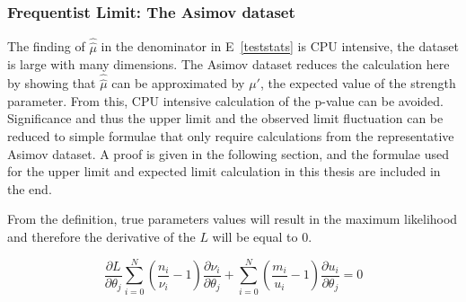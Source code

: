 


%
%
%
%





\subsubsection{Frequentist Limit: The Asimov dataset}
\label{sec:asimov}

The finding of $\hat{\hat{\mu}}$ in the denominator in E~\ref{teststats} is CPU intensive, the dataset is large with many dimensions. The Asimov dataset reduces the calculation here by showing that $\hat{\hat{\mu}}$ can be approximated by $\mu'$, the expected value of the strength parameter. From this, CPU intensive calculation of the p-value can be avoided. Significance and thus the upper limit and the observed limit fluctuation can be reduced to simple formulae that only
require calculations from the representative Asimov dataset. 
A proof is given in the following section, and the formulae used for the upper limit and expected limit calculation in this thesis are included in the end. 

From the definition, true parameters values will result in the maximum likelihood and therefore the derivative of the ${L}$ will be equal to 0. 

\begin{equation}
\frac{\partial{L}}{\partial{\theta_{j}}} \sum_{i=0}^{N}(\frac{n_{i}}{\nu_{i}}-1) \frac{\partial{\nu_{i}}}{\partial{\theta_{j}}}+ \sum_{i=0}^{N}(\frac{m_{i}}{u_{i}}-1) \frac{\partial{u_{i}}}{\partial{\theta_{j}}} =  0 
\end{equation}

